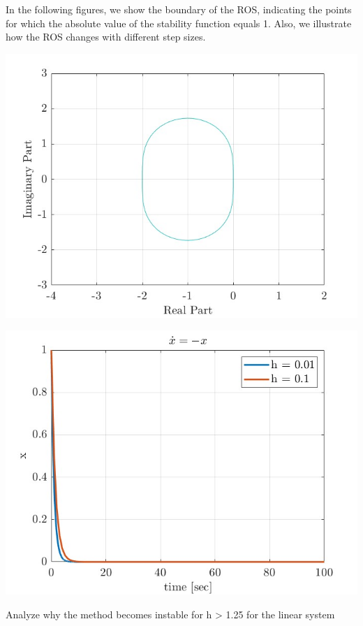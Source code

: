 \documentclass[11pt]{article}
\begin{document}
\begin{question}
{	In the following figures, we show the boundary of the ROS, indicating the points for which the absolute value of the stability function equals 1. Also, we illustrate how the ROS changes with different step sizes.
	\begin{center}
		\includegraphics[width=0.7\columnwidth]{1.jpg} %
	\end{center}
	\begin{center}
		\includegraphics[width=0.7\columnwidth]{2.jpg} %
	\end{center}
	
	}

	\begin{subquestion}{Analyze why the method becomes instable for h > 1.25 for the linear system}

	\end{subquestion}
\end{question}
\end{document}
